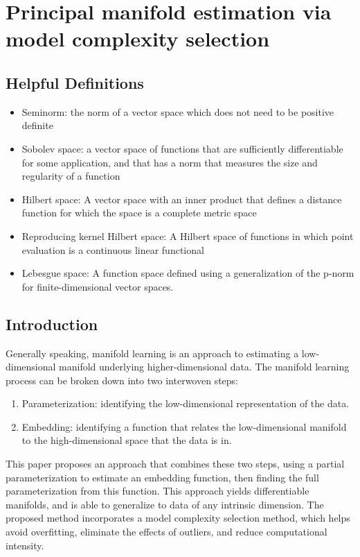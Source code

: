\section*{Principal manifold estimation via model complexity selection}

\subsection*{Helpful Definitions}
\begin{itemize}
    \item Seminorm: the norm of a vector space which does not need to be positive definite
    \item Sobolev space: a vector space of functions that are sufficiently differentiable for some application, and that has a norm that measures the size and regularity of a function
    \item Hilbert space: A vector space with an inner product that defines a distance function for which the space is a complete metric space
    \item Reproducing kernel Hilbert space: A Hilbert space of functions in which point evaluation is a continuous linear functional
    \item Lebesgue space: A function space defined using a generalization of the p-norm for finite-dimensional vector spaces.
\end{itemize}

\subsection*{Introduction}
Generally speaking, manifold learning is an approach to estimating a low-dimensional manifold underlying higher-dimensional data. The manifold learning process can be broken down into two interwoven steps:
\begin{enumerate}
    \item Parameterization: identifying the low-dimensional representation of the data.
    \item Embedding: identifying a function that relates the low-dimensional manifold to the high-dimensional space that the data is in.
\end{enumerate}

This paper proposes an approach that combines these two steps, using a partial parameterization to estimate an embedding function, then finding the full parameterization from this function. This approach yields differentiable manifolds, and is able to generalize to data of any intrinsic dimension. The proposed method incorporates a model complexity selection method, which helps avoid overfitting, eliminate the effects of outliers, and reduce computational intensity.

